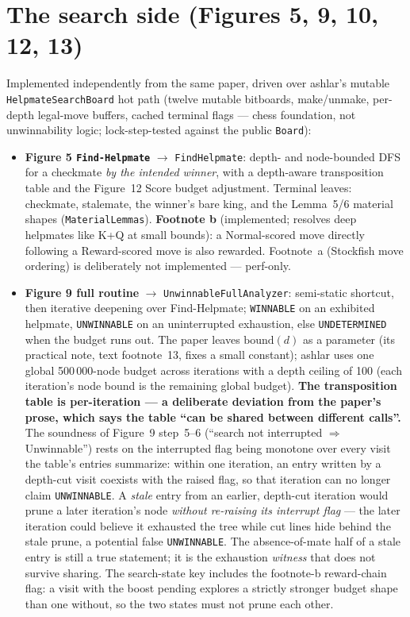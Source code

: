 \documentclass[11pt]{article}
\newcommand{\code}[1]{\texttt{#1}}
\theoremstyle{plain}
\theoremstyle{definition}
\begin{document}
\section{The search side (Figures 5, 9, 10, 12, 13)}

Implemented independently from the same paper, driven over ashlar's mutable \code{HelpmateSearchBoard} hot path
(twelve mutable bitboards, make/unmake, per-depth legal-move buffers, cached terminal flags --- chess foundation, not
unwinnability logic; lock-step-tested against the public \code{Board}):

\begin{itemize}[leftmargin=1.4em]
  \item \textbf{Figure 5 \code{Find-Helpmate}} $\rightarrow$ \code{FindHelpmate}: depth- and node-bounded DFS for a checkmate \emph{by the intended winner}, with a depth-aware transposition table and the Figure~12 Score budget adjustment. Terminal leaves: checkmate, stalemate, the winner's bare king, and the Lemma~5/6 material shapes (\code{MaterialLemmas}). \textbf{Footnote b} (implemented; resolves deep helpmates like K+Q at small bounds): a Normal-scored move directly following a Reward-scored move is also rewarded. Footnote~a (Stockfish move ordering) is deliberately not implemented --- perf-only.
  \item \textbf{Figure 9 full routine} $\rightarrow$ \code{UnwinnableFullAnalyzer}: semi-static shortcut, then iterative deepening over Find-Helpmate; \code{WINNABLE} on an exhibited helpmate, \code{UNWINNABLE} on an uninterrupted exhaustion, else \code{UNDETERMINED} when the budget runs out. The paper leaves $\mathrm{bound}(d)$ as a parameter (its practical note, text footnote~13, fixes a small constant); ashlar uses one global 500\,000-node budget across iterations with a depth ceiling of 100 (each iteration's node bound is the remaining global budget). \textbf{The transposition table is per-iteration --- a deliberate deviation from the paper's prose, which says the table ``can be shared between different calls''.} The soundness of Figure~9 step~5--6 (``search not interrupted $\Rightarrow$ Unwinnable'') rests on the interrupted flag being monotone over every visit the table's entries summarize: within one iteration, an entry written by a depth-cut visit coexists with the raised flag, so that iteration can no longer claim \code{UNWINNABLE}. A \emph{stale} entry from an earlier, depth-cut iteration would prune a later iteration's node \emph{without re-raising its interrupt flag} --- the later iteration could believe it exhausted the tree while cut lines hide behind the stale prune, a potential false \code{UNWINNABLE}. The absence-of-mate half of a stale entry is still a true statement; it is the exhaustion \emph{witness} that does not survive sharing. The search-state key includes the footnote-b reward-chain flag: a visit with the boost pending explores a strictly stronger budget shape than one without, so the two states must not prune each other.

\end{itemize}
\end{document}
